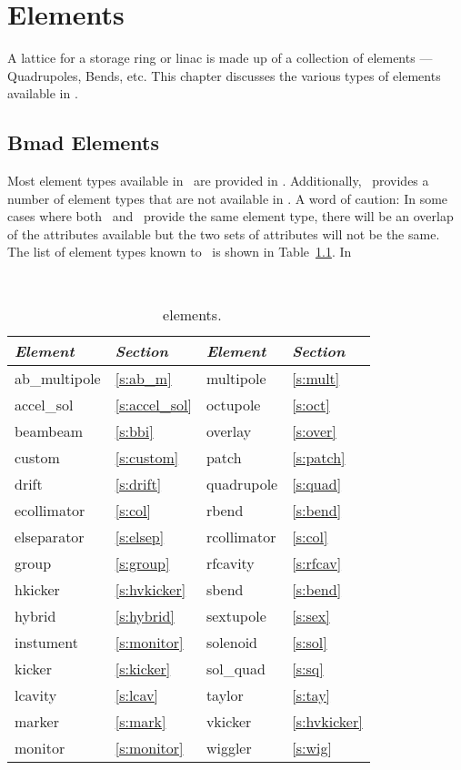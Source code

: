 \chapter{Elements}

A lattice for a storage ring or linac is made up of a collection of
elements --- Quadrupoles, Bends, etc. This chapter discusses the
various types of elements available in \bmad.

\section{Bmad Elements}

Most element types available in \mad\ are provided in \bmad.
Additionally, \bmad\ provides a number of element types that are not
available in \mad.  A word of caution: In some cases where both \mad\
and \bmad\ provide the same element type, there will be an overlap of 
the attributes available but the two sets of attributes will not be the same.
The list of element types known to \bmad\ is shown in Table~\ref{tab:elements}.
In
\begin{table}[h]
{\centering
{\tt
\begin{tabular}{|l|l||l|l|} \hline
  {\it Element} & {\it Section}     & {\it Element} & {\it Section}    \\ \hline
  ab\_multipole & \ref{s:ab_m}      &  multipole    & \ref{s:mult}     \\ \hline
  accel\_sol    & \ref{s:accel_sol} &  octupole     & \ref{s:oct}      \\ \hline
  beambeam      & \ref{s:bbi}       &  overlay      & \ref{s:over}     \\ \hline
  custom        & \ref{s:custom}    &  patch        & \ref{s:patch}    \\ \hline
  drift         & \ref{s:drift}     &  quadrupole   & \ref{s:quad}     \\ \hline
  ecollimator   & \ref{s:col}       &  rbend        & \ref{s:bend}     \\ \hline
  elseparator   & \ref{s:elsep}     &  rcollimator  & \ref{s:col}      \\ \hline
  group         & \ref{s:group}     &  rfcavity     & \ref{s:rfcav}    \\ \hline
  hkicker       & \ref{s:hvkicker}  &  sbend        & \ref{s:bend}     \\ \hline
  hybrid        & \ref{s:hybrid}    &  sextupole    & \ref{s:sex}      \\ \hline
  instument     & \ref{s:monitor}   &  solenoid     & \ref{s:sol}      \\ \hline
  kicker        & \ref{s:kicker}    &  sol\_quad    & \ref{s:sq}       \\ \hline
  lcavity       & \ref{s:lcav}      &  taylor       & \ref{s:tay}      \\ \hline
  marker        & \ref{s:mark}      &  vkicker      & \ref{s:hvkicker} \\ \hline
  monitor       & \ref{s:monitor}   &  wiggler      & \ref{s:wig}      \\ \hline
\end{tabular}
}}
\caption{\bmad\ elements.}
\label{tab:elements}\center
\end{table}

